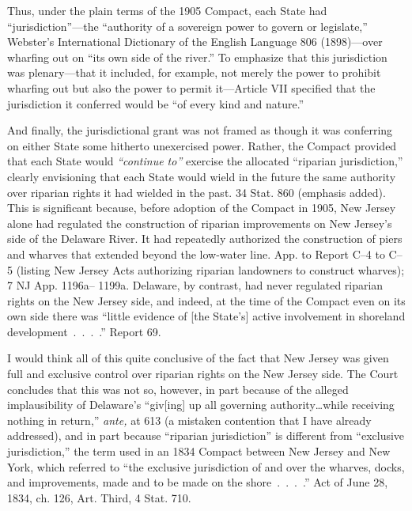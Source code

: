 {  Thus, under the plain terms of the 1905 Compact, each State had
``jurisdiction''---the ``authority of a sovereign power to govern
or legislate,'' Webster's International Dictionary of the English
Language 806 (1898)---over wharfing out on ``its own side of the
river.'' To emphasize that this jurisdiction was plenary---that it
included, for example, not merely the power to prohibit wharfing out
but also the power to permit it---Article VII specified that the
jurisdiction it conferred would be ``of every kind and nature.''

  And finally, the jurisdictional grant was not framed as though it was
conferring on either State some hitherto unexercised power. Rather, the
Compact provided that each State would \emph{``continue to''} exercise
the allocated ``riparian jurisdiction,'' clearly envisioning that each
State would wield in the future the same authority over riparian rights
it had \newpage  wielded in the past. 34 Stat. 860 (emphasis added). This
is significant because, before adoption of the Compact in 1905, New
Jersey alone had regulated the construction of riparian improvements
on New Jersey's side of the Delaware River. It had repeatedly
authorized the construction of piers and wharves that extended beyond
the low-water line. App. to Report C--4 to C--5 (listing New Jersey
Acts authorizing riparian landowners to construct wharves); 7 NJ App.
1196a-- 1199a. Delaware, by contrast, had never regulated riparian
rights on the New Jersey side, and indeed, at the time of the Compact
even on its own side there was ``little evidence of [the State's]
active involvement in shoreland development~.~.~.~.'' Report
69.

  I would think all of this quite conclusive of the fact that New
Jersey was given full and exclusive control over riparian rights
on the New Jersey side. The Court concludes that this was not so,
however, in part because of the alleged implausibility of Delaware's
``giv[ing] up all governing authority\dots while receiving nothing
in return,'' \emph{ante,} at 613 (a mistaken contention that I have
already addressed), and in part because ``riparian jurisdiction''
is different from ``exclusive jurisdiction,'' the term used in an
1834 Compact between New Jersey and New York, which referred to ``the
exclusive jurisdiction of and over the wharves, docks, and improvements,
made and to be made on the shore~.~.~.~.'' Act of June 28, 1834,
ch. 126, Art. Third, 4 Stat. 710.

}
